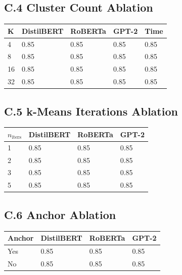 \subsection{C.4 Cluster Count Ablation}

\begin{table}[H]
\centering
\small
\begin{tabular}{lllll}
\toprule
\textbf{K} & \textbf{DistilBERT} & \textbf{RoBERTa} & \textbf{GPT-2} & \textbf{Time} \\
\midrule
4 & 0.85 & 0.85 & 0.85 & 0.85 \\
8 & 0.85 & 0.85 & 0.85 & 0.85 \\
16 & 0.85 & 0.85 & 0.85 & 0.85 \\
32 & 0.85 & 0.85 & 0.85 & 0.85 \\
\bottomrule
\end{tabular}
\end{table}

\subsection{C.5 k-Means Iterations Ablation}

\begin{table}[H]
\centering
\small
\begin{tabular}{llll}
\toprule
\textbf{$n_{\text{iters}}$} & \textbf{DistilBERT} & \textbf{RoBERTa} & \textbf{GPT-2} \\
\midrule
1 & 0.85 & 0.85 & 0.85 \\
2 & 0.85 & 0.85 & 0.85 \\
3 & 0.85 & 0.85 & 0.85 \\
5 & 0.85 & 0.85 & 0.85 \\
\bottomrule
\end{tabular}
\end{table}

\subsection{C.6 Anchor Ablation}

\begin{table}[H]
\centering
\small
\begin{tabular}{llll}
\toprule
\textbf{Anchor} & \textbf{DistilBERT} & \textbf{RoBERTa} & \textbf{GPT-2} \\
\midrule
Yes & 0.85 & 0.85 & 0.85 \\
No & 0.85 & 0.85 & 0.85 \\
\bottomrule
\end{tabular}
\end{table}

